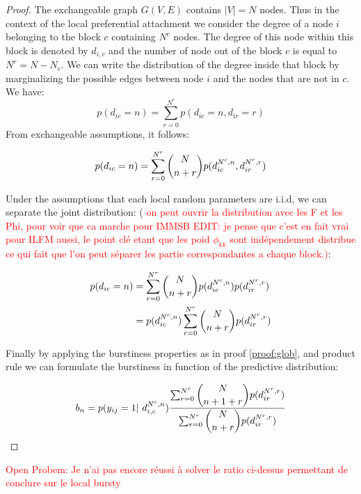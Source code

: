 \begin{proof}
The exchangeable graph $G(V,E)$ contains $|V|=N$ nodes. Thus in the context of the local preferential attachment we consider the degree of a node $i$ belonging to the block $c$ containing $N^c$ nodes. The degree of this node within this block is denoted by $d_{i,c}$ and the  number of node out of the block $c$ is equal to $N^r = N - N_c$. We can write the distribution of the degree inside that block by marginalizing the possible edges between node $i$ and the nodes that are not in $c$. We have:
\begin{equation*}
p(d_{ic}=n) = \sum_{r=0}^{N^r} p(d_{ic}=n,d_{ir}=r)
\end{equation*}
From exchangeable assumptions, it follows:

\begin{equation*}
p(d_{ic}=n) = \sum_{r=0}^{N^r} \dbinom{N}{n+r} p(d_{ic}^{N^c, n},d_{ir}^{N^r, r})
\end{equation*}

Under the assumptions that each local random parameters are i.i.d, we can separate the joint distribution: ( \textcolor{red}{on peut ouvrir la distribution avec les F et les Phi, pour voir que ca marche pour IMMSB EDIT: je pense que c'est en fait vrai pour ILFM aussi, le point clé etant que les poid $\phi_{kk}$ sont indépendement distribue ce qui fait que l'on peut séparer les partie correspondantes a chaque block.)}: 

\begin{align*}
p(d_{ic}=n) &= \sum_{r=0}^{N^r} \dbinom{N}{n+r} p(d_{ic}^{N^c, n}) p(d_{ir}^{N^r, r}) \\
 &=  p(d_{ic}^{N^c, n})\sum_{r=0}^{N^r}   \dbinom{N}{n+r} p(d_{ir}^{N^r, r})
\end{align*}

Finally by applying the burstiness properties as in proof \ref{proof:glob}, and product rule we can formulate the burstiness in function of the predictive distribution:

\begin{equation} \label{eq:29}
b_n =  p(y_{ij}=1 | d_{i,c}^{N^c,n}) \frac{\sum_{r=0}^{N^r}\dbinom{N}{n+1+r} p(d_{ir}^{N^r,r})}{\sum_{r=0}^{N^r} \dbinom{N}{n+r} p(d_{ir}^{N^r,r}) }
\end{equation}

\end{proof}

\textcolor{red}{Open Probem:  Je n'ai pas encore réussi à solver le ratio ci-dessus permettant de conclure sur le local bursty}


